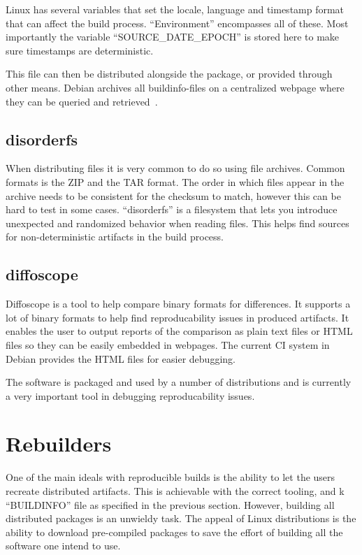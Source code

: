 \documentclass[../Main/thesis.tex]{subfiles}
\begin{document}
Linux has several variables that set the locale, language and timestamp format
that can affect the build process. ``Environment'' encompasses all of these.
Most importantly the variable ``SOURCE\_DATE\_EPOCH'' is stored here to make
sure timestamps are deterministic.

This file can then be distributed alongside the package, or provided through
other means. Debian archives all buildinfo-files on a centralized webpage where
they can be queried and retrieved~\cite{buildinfo-debian}.

\subsection*{disorderfs}
When distributing files it is very common to do so using file archives. Common
formats is the ZIP and the TAR format. The order in which files appear in the
archive needs to be consistent for the checksum to match, however this can be
hard to test in some cases. ``disorderfs'' is a filesystem that lets you
introduce unexpected and randomized behavior when reading files. This helps find
sources for non-deterministic artifacts in the build process.


\subsection*{diffoscope}
Diffoscope is a tool to help compare binary formats for differences. It supports
a lot of binary formats to help find reproducability issues in produced
artifacts. It enables the user to output reports of the comparison as plain text
files or HTML files so they can be easily embedded in webpages. The current CI
system in Debian provides the HTML files for easier debugging.

The software is packaged and used by a number of distributions and is currently
a very important tool in debugging reproducability issues.


\section{Rebuilders}\label{sec:rebuilders} 
One of the main ideals with reproducible builds is the ability to let the users
recreate distributed artifacts. This is achievable with the correct tooling, and
k ``BUILDINFO'' file as specified in the previous section. However, building all
distributed packages is an unwieldy task. The appeal of Linux distributions is
the ability to download pre-compiled packages to save the effort of building all
the software one intend to use.
\end{document}

